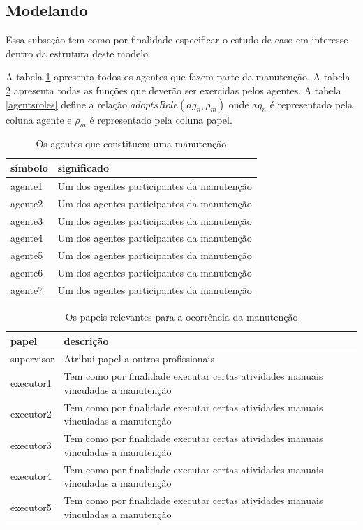 \documentclass[12pt]{article}
\begin{document}
\subsection{Modelando}

Essa subseção tem como por finalidade especificar o estudo de caso em interesse dentro da estrutura deste modelo. 



A tabela \ref{agents} apresenta todos os agentes que fazem parte da manutenção. A tabela \ref{roles} apresenta todas as funções que deverão ser exercidas pelos agentes. A tabela \ref{agentsroles} define a relação $adoptsRole(ag_n,\rho_m)$ onde $ag_n$ é representado pela coluna agente e $\rho_m$ é representado pela coluna papel.

\begin{table}[H]
\centering
\begin{tabular}{|l|l|}
\hline
\textbf{símbolo} & \textbf{significado} \\ \hline
agente1 & Um dos agentes participantes da manutenção \\ \hline
agente2 & Um dos agentes participantes da manutenção \\ \hline
agente3 & Um dos agentes participantes da manutenção \\ \hline
agente4 & Um dos agentes participantes da manutenção \\ \hline
agente5 & Um dos agentes participantes da manutenção \\ \hline
agente6 & Um dos agentes participantes da manutenção \\ \hline
agente7 & Um dos agentes participantes da manutenção \\ \hline
\end{tabular}
\caption{Os agentes que constituem uma manutenção}
\label{agents}
\end{table}


\begin{table}[H]
\centering
\begin{tabular}{|l|l|}
\hline
\textbf{papel} & \textbf{descrição} \\ \hline
supervisor & Atribui papel a outros profissionais \\ \hline
executor1 & Tem como por finalidade executar certas atividades manuais vinculadas a manutenção \\ \hline
executor2 & Tem como por finalidade executar certas atividades manuais vinculadas a manutenção \\ \hline
executor3 & Tem como por finalidade executar certas atividades manuais vinculadas a manutenção \\ \hline
executor4 & Tem como por finalidade executar certas atividades manuais vinculadas a manutenção \\ \hline
executor5 & Tem como por finalidade executar certas atividades manuais vinculadas a manutenção \\ \hline
\end{tabular}
\caption{Os papeis relevantes para a ocorrência da manutenção}
\label{roles}
\end{table}
\end{document}
